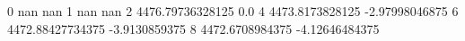 0 nan nan
1 nan nan
2 4476.79736328125 0.0
4 4473.8173828125 -2.97998046875
6 4472.88427734375 -3.9130859375
8 4472.6708984375 -4.12646484375
